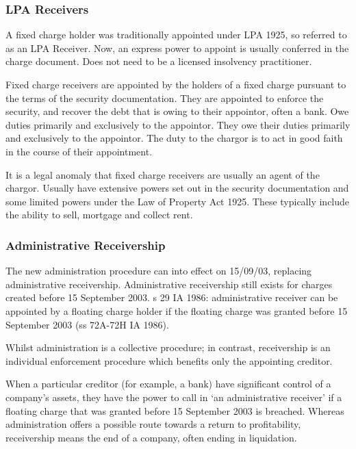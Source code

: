\documentclass[
]{article}
\begin{document}
\hypertarget{lpa-receivers}{%
\subsubsection{LPA Receivers}\label{lpa-receivers}}

A fixed charge holder was traditionally appointed under LPA 1925, so
referred to as an LPA Receiver. Now, an express power to appoint is
usually conferred in the charge document. Does not need to be a licensed
insolvency practitioner.

Fixed charge receivers are appointed by the holders of a fixed charge
pursuant to the terms of the security documentation. They are appointed
to enforce the security, and recover the debt that is owing to their
appointor, often a bank. Owe duties primarily and exclusively to the
appointor. They owe their duties primarily and exclusively to the
appointor. The duty to the chargor is to act in good faith in the course
of their appointment.

It is a legal anomaly that fixed charge receivers are usually an agent
of the chargor. Usually have extensive powers set out in the security
documentation and some limited powers under the Law of Property Act
1925. These typically include the ability to sell, mortgage and collect
rent.

\hypertarget{administrative-receivership}{%
\subsubsection{Administrative
Receivership}\label{administrative-receivership}}

The new administration procedure can into effect on 15/09/03, replacing
administrative receivership. Administrative receivership still exists
for charges created before 15 September 2003. s 29 IA 1986:
administrative receiver can be appointed by a floating charge holder if
the floating charge was granted before 15 September 2003 (ss 72A-72H IA
1986).

Whilst administration is a collective procedure; in contrast,
receivership is an individual enforcement procedure which benefits only
the appointing creditor.

When a particular creditor (for example, a bank) have significant
control of a company's assets, they have the power to call in `an
administrative receiver' if a floating charge that was granted before 15
September 2003 is breached. Whereas administration offers a possible
route towards a return to profitability, receivership means the end of a
company, often ending in liquidation.
\end{document}
